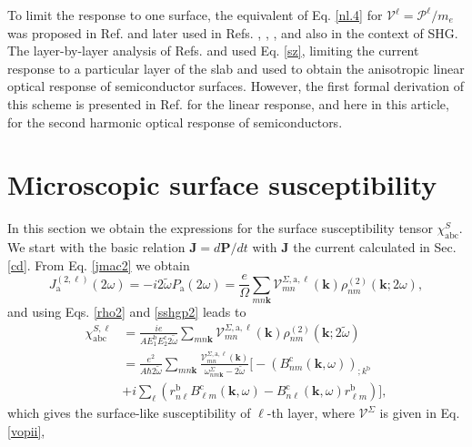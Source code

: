 To limit the response to one surface, the equivalent of Eq. \eqref{nl.4} 
for $\boldsymbol{\mathcal{V}}^\ell=\boldsymbol{\mathcal{P}}^\ell/m_{e}$ was proposed in 
Ref. \cite{reiningPRB94} and later used in Refs.
\cite{mendozaPRL98},
\cite{mendozaPRB01},
\cite{sanoPRB02},
 and \cite{mejiaRMF04} 
also in the context of SHG. 
The layer-by-layer analysis of Refs. \cite{hoganPRB03} 
and \cite{castilloPRB03} used Eq. \eqref{sz}, 
limiting the current response
to a particular layer of the slab and used to obtain the
anisotropic linear optical response of semiconductor surfaces.
However, the first formal derivation of this scheme is presented in
Ref. \cite{mendozaPRB06} for the linear response, and here in this 
article, for the second harmonic optical response of semiconductors.


\section{Microscopic surface susceptibility}
In this section we obtain the expressions for the 
surface susceptibility tensor $\chi^S_{\mathrm{abc}}$.
We start with the basic relation $\mathbf{J} = d\mathbf{P}/dt$ 
with $\mathbf{J}$ the current calculated in Sec. \ref{cd}. From Eq. \eqref{jmac2} 
we obtain
\begin{equation}\label{Pjikn}
J_{\mathrm{a}}^{(2,\ell)}(2\omega)=-i2\tilde{\omega} P_{\mathrm{a}}(2\omega)
=\frac{e}{\Omega}
\sum_{mn\mathbf{k}}
\mathcal{V}^{\Sigma,\mathrm{a},\ell}_{mn}(\mathbf{k})
\rho^{(2)}_{nm}(\mathbf{k};2\omega)
,
\end{equation}
and using Eqs. \eqref{rho2} and \eqref{sshgp2} leads to
\begin{align}\label{Pjikn2}
\chi^{S,\ell}_{\mathrm{abc}}
&=
\frac{ie}{A E^{\mathrm{b}}_1E^{\mathrm{c}}_2 2\tilde{\omega}}
\sum_{mn\mathbf{k}}
\mathcal{V}^{\Sigma,\mathrm{a},\ell}_{mn}(\mathbf{k})
\rho^{(2)}_{nm}(\mathbf{k};2\tilde{\omega})
\nonumber \\
&=
\frac{e^2}{A\hbar2\tilde{\omega}}
\sum_{mn\mathbf{k}}
\frac{\mathcal{V}^{\Sigma,\mathrm{a},\ell}_{mn}(\mathbf{k})}
{\omega^\Sigma_{nm\mathbf{k}}-2\tilde{\omega}}
\bigg[
-(B_{nm}^{\mathrm{c}}(\mathbf{k},\omega))_{;k^{\mathrm{b}}}
\nonumber \\
&
+i\sum_\ell\left(r_{n\ell}^{\mathrm{b}}B_{\ell m}^{\mathrm{c}}(\mathbf{k},\omega) -
  B_{n\ell}^{\mathrm{c}}(\mathbf{k},\omega) 
  r_{\ell m}^{\mathrm{b}}\right)
\bigg]
,
\end{align}
which gives the surface-like susceptibility of $\ell$-th layer, where 
$\boldsymbol{\mathcal{V}}^\Sigma$ is given in Eq. \eqref{vopii},

